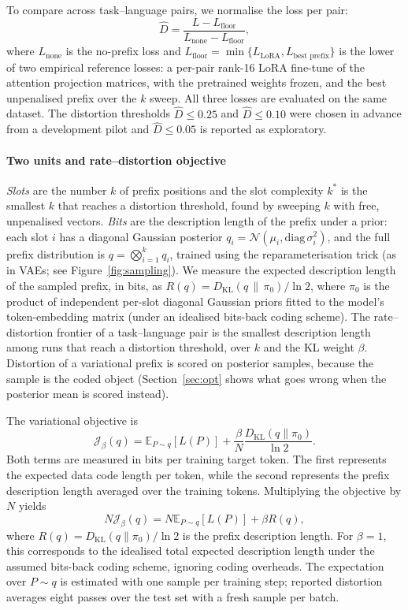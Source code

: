 \documentclass{article}
\newcommand{\Dh}{\hat D}
\begin{document}
To compare across task--language pairs, we normalise the loss per pair:
\begin{equation}
\Dh = \frac{L-L_{\text{floor}}}
{L_{\text{none}}-L_{\text{floor}}},
\end{equation}
where $L_{\text{none}}$ is the no-prefix loss and $L_{\text{floor}} = \min\{L_{\text{LoRA}}, L_{\text{best prefix}}\}$ is the lower of two empirical reference losses: a per-pair rank-16 LoRA fine-tune of the attention projection matrices, with the pretrained weights frozen, and the best unpenalised prefix over the $k$ sweep. All three losses are evaluated on the same dataset. The distortion thresholds $\Dh\le0.25$ and $\Dh\le0.10$ were chosen in advance from a development pilot and $\Dh\le0.05$ is reported as exploratory.

\paragraph{Two units and rate--distortion objective}
\emph{Slots} are the number $k$ of prefix positions and the slot complexity $k^\ast$ is the smallest $k$ that reaches a distortion threshold, found by sweeping $k$ with free, unpenalised vectors. \emph{Bits} are the description length of the prefix under a prior: each slot $i$ has a diagonal Gaussian posterior $q_i=\mathcal N(\mu_i,\mathrm{diag}\,\sigma_i^2)$, and the full prefix distribution is $q=\bigotimes_{i=1}^k q_i$, trained using the reparameterisation trick (as in VAEs; see Figure~\ref{fig:sampling}). We measure the expected description length of the sampled prefix, in bits, as $R(q)=D_{\mathrm{KL}}(q\,\|\,\pi_0)/\ln 2$, where $\pi_0$ is the product of independent per-slot diagonal Gaussian priors fitted to the model's token-embedding matrix (under an idealised bits-back coding scheme). The rate--distortion frontier of a task--language pair is the smallest description length among runs that reach a distortion threshold, over $k$ and the KL weight $\beta$. Distortion of a variational prefix is scored on posterior samples, because the sample is the coded object (Section~\ref{sec:opt} shows what goes wrong when the posterior mean is scored instead).

The variational objective is
\[
\mathcal{J}_{\beta}(q)
=
\mathbb{E}_{P \sim q}[L(P)]
+
\frac{\beta}{N}
\frac{D_{\mathrm{KL}}(q \| \pi_0)}{\ln 2}.
\]
Both terms are measured in bits per training target token. The first represents the expected data code length per token, while the second represents the prefix description length averaged over the training tokens. Multiplying the objective by $N$ yields
\[
N\mathcal{J}_{\beta}(q)
=
N\mathbb{E}_{P \sim q}[L(P)]
+
\beta R(q),
\]
where $R(q) = D_{\mathrm{KL}}(q \| \pi_0) / \ln 2$ is the prefix description length. For $\beta=1$, this corresponds to the idealised total expected description length under the assumed bits-back coding scheme, ignoring coding overheads. The expectation over $P\sim q$ is estimated with one sample per training step; reported distortion averages eight passes over the test set with a fresh sample per batch.
\end{document}
